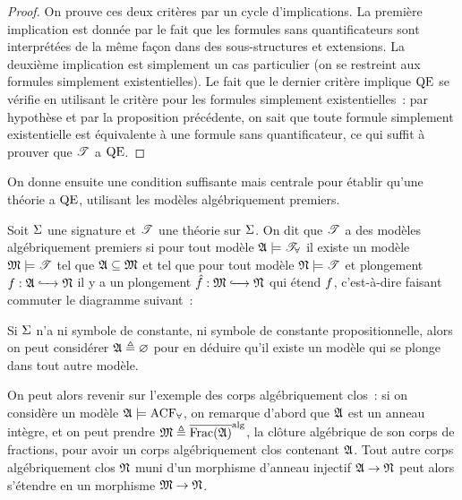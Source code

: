 \begin{proof}
  On prouve ces deux critères par un cycle d'implications. La première
  implication est donnée par le fait que les formules sans quantificateurs sont
  interprétées de la même façon dans des sous-structures et extensions. La
  deuxième implication est simplement un cas particulier (on se restreint aux
  formules simplement existentielles). Le fait que le dernier critère implique
  $\operatorname{QE}$ se vérifie en utilisant le critère pour les formules simplement
  existentielles~: par hypothèse et par la proposition précédente, on sait que
  toute formule simplement existentielle est équivalente à une formule sans
  quantificateur, ce qui suffit à prouver que $\mathscr T$ a $\operatorname{QE}$.
\end{proof}

On donne ensuite une condition suffisante mais centrale pour établir qu'une
théorie a $\operatorname{QE}$, utilisant les modèles algébriquement premiers.

\begin{definition}
  Soit $\Sigma$ une signature et $\mathscr T$ une théorie sur $\Sigma$. On dit que
  $\mathscr T$ a des modèles algébriquement premiers si pour tout modèle
  $\mathfrak{A}\models\mathscr T_{\forall}$ il existe un modèle $\mathfrak{M}\models\mathscr T$ tel
  que $\mathfrak{A}\subseteq\mathfrak{M}$ et tel que pour tout modèle $\mathfrak{N}\models\mathscr T$
  et plongement $f : \displaystyle \mathfrak{A} \xhookrightarrow{\quad} \mathfrak{N}$ il y a un plongement
  $\hat{f} : \displaystyle \mathfrak{M} \xhookrightarrow{\quad} \mathfrak{N}$ qui étend $f$,
  c'est-à-dire faisant commuter le diagramme suivant~:
  \begin{center}
  \end{center}
\end{definition}

\begin{remark}
  Si $\Sigma$ n'a ni symbole de constante, ni symbole de constante
  propositionnelle, alors on peut considérer $\mathfrak{A} \triangleq\varnothing$ pour en
  déduire qu'il existe un modèle qui se plonge dans tout autre modèle.
\end{remark}

\begin{example}
  On peut alors revenir sur l'exemple des corps algébriquement clos~: si on
  considère un modèle $\mathfrak{A}\models\operatorname{ACF}_{\forall}$, on remarque d'abord que
  $\mathfrak{A}$ est un anneau intègre, et on peut prendre
  $\mathfrak{M}\triangleq \overline{\mathrm{Frac}(\mathfrak{A})}^{\mathrm{alg}}$, la clôture
  algébrique de son corps de fractions, pour avoir un corps algébriquement clos
  contenant $\mathfrak{A}$. Tout autre corps algébriquement clos $\mathfrak{N}$ muni d'un
  morphisme d'anneau injectif $\mathfrak{A}\to\mathfrak{N}$ peut alors s'étendre en
  un morphisme $\mathfrak{M}\to\mathfrak{N}$.
\end{example}

